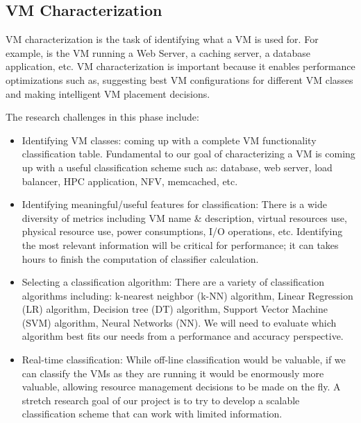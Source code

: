 \subsection{VM Characterization}
VM characterization is the task of identifying what a VM is used for. For example, is the VM running a Web Server, a caching server, a database application, etc. VM characterization is important because it enables performance optimizations such as, suggesting best VM configurations for different VM classes and making intelligent VM placement decisions. 

The research challenges in this phase include:
\begin{itemize}
\item Identifying VM classes: coming up with a complete VM functionality classification table. Fundamental to our goal of characterizing a VM is coming up with a useful classification scheme such as: database, web server, load balancer, HPC application, NFV, memcached, etc.  

\item Identifying meaningful/useful features for classification: There is a wide diversity of metrics including VM name \& description, virtual resources use, physical resource use, power consumptions, I/O operations, etc.  Identifying the most relevant information will be critical for performance; it can takes hours to finish the computation of classifier calculation. 

\item Selecting a classification algorithm: There are a variety of classification algorithms including: k-nearest neighbor (k-NN) algorithm, Linear Regression (LR) algorithm, Decision tree (DT) algorithm, Support Vector Machine (SVM) algorithm, Neural Networks (NN). We will need to evaluate which algorithm best fits our needs from a performance and accuracy perspective. 

\item Real-time classification: While off-line classification would be valuable, if we can classify the VMs as they are running it would be enormously more valuable, allowing resource management decisions to be made on the fly.  A stretch research goal of our project is to try to develop a scalable classification scheme that can work with limited information. 

\end{itemize}
